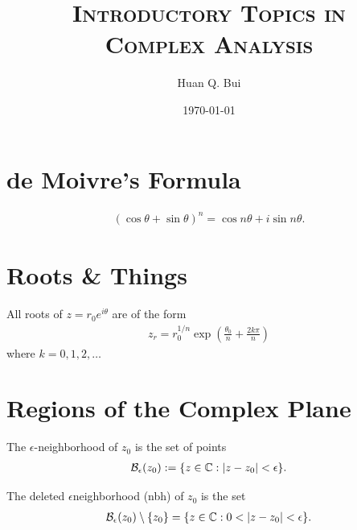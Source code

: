 \documentclass{article}
\theoremstyle{definition}
\newcommand{\f}[2]{\frac{#1}{#2}}
\newcommand{\C}{\mathbb{C}}
\newcommand{\B}{\mathcal{B}}
\newcommand{\lp}{\left(}
\newcommand{\rp}{\right)}
\begin{document}
	\begin{titlepage}\centering
		\clearpage
		\title{\textsc{\bf{Introductory Topics in \\ Complex Analysis}}}
		\author{\bigskip Huan Q. Bui}
		\date{\today}
		\maketitle
		\thispagestyle{empty}
	\end{titlepage}




\newpage
\tableofcontents
\newpage



\section{de Moivre's Formula}

\begin{align}
(\cos\theta + \sin\theta)^n = \cos n \theta + i\sin n \theta.
\end{align}

\section{Roots \& Things}

All roots of $z = r_0 e^{i\theta}$ are of the form
\begin{align}
z_r = r_0^{1/n}\exp\lp \f{\theta_0}{n} + \f{2k \pi}{n} \rp
\end{align}
where $k = 0,1,2,\dots$


\section{Regions of the Complex Plane}

\noindent The $\epsilon$-neighborhood of $z_0$ is the set of points
\begin{align}
\B_\epsilon (z_0) := \{ z\in \C : \abs{z - z_0} < \epsilon \}.
\end{align}

\noindent The deleted $\epsilon$neighborhood (nbh) of $z_0$ is the set
\begin{align}
\B_\epsilon(z_0) \setminus \{z_0\} = \{ z\in \C : 0 < \abs{z - z_0} < \epsilon \}.
\end{align}
\end{document}
